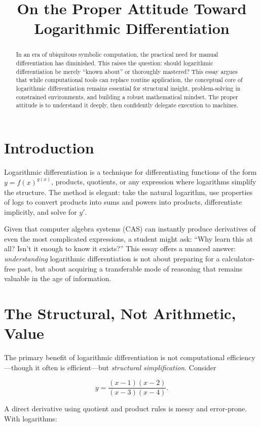 \documentclass[12pt]{article}
\title{On the Proper Attitude Toward Logarithmic Differentiation}
\author{}
\date{}
\begin{document}
\maketitle

\begin{abstract}
In an era of ubiquitous symbolic computation, the practical need for manual differentiation has diminished. This raises the question: should logarithmic differentiation be merely ``known about'' or thoroughly mastered? This essay argues that while computational tools can replace routine application, the conceptual core of logarithmic differentiation remains essential for structural insight, problem-solving in constrained environments, and building a robust mathematical mindset. The proper attitude is to understand it deeply, then confidently delegate execution to machines.
\end{abstract}

\section*{Introduction}

Logarithmic differentiation is a technique for differentiating functions of the form 
\(y = f(x)^{g(x)}\), products, quotients, or any expression where logarithms simplify the structure. 
The method is elegant: take the natural logarithm, use properties of logs to convert products into sums and powers into products, differentiate implicitly, and solve for \(y'\).

Given that computer algebra systems (CAS) can instantly produce derivatives of even the most complicated expressions, a student might ask: ``Why learn this at all? Isn't it enough to know it exists?'' This essay offers a nuanced answer: \emph{understanding} logarithmic differentiation is not about preparing for a calculator-free past, but about acquiring a transferable mode of reasoning that remains valuable in the age of information.

\section*{The Structural, Not Arithmetic, Value}

The primary benefit of logarithmic differentiation is not computational efficiency—though it often is efficient—but \emph{structural simplification}. Consider

\[
y = \frac{(x-1)(x-2)}{(x-3)(x-4)}.
\]

A direct derivative using quotient and product rules is messy and error-prone. With logarithms:
\end{document}

